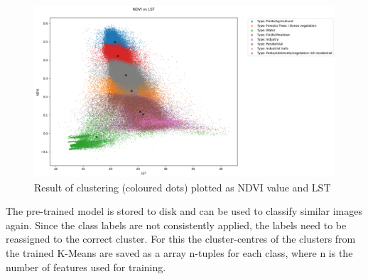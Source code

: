 \documentclass[12pt,a4paper, english,twoside]{article}
\begin{document}
        \begin{figure}[!htbp]
          \centering
          \includegraphics[width=\textwidth]{img/NDVI vs LST.png}
          \caption{Result of clustering (coloured dots) plotted as \gls{NDVI} value and \gls{LST}\label{fig:kmeansclusters}}
        \end{figure}

    The pre-trained model is stored to disk and can be used to classify similar images again. 
    Since the class labels are not consistently applied, the labels need to be reassigned to the correct cluster.
    For this the cluster-centres of the clusters from the trained K-Means are saved as a array n-tuples for each class, where n is the number of features used for training.
    \newpage
\end{document}
